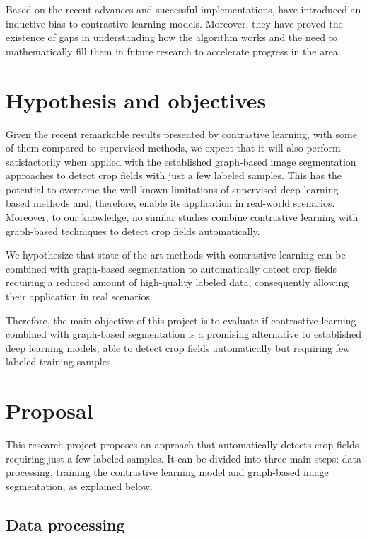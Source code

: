 \documentclass[12pt]{article}
\begin{document}
Based on the recent advances and successful implementations, \citet{saunshi2022} have introduced an inductive bias to contrastive learning models. Moreover, they have proved the existence of gaps in understanding how the algorithm works and the need to mathematically fill them in future research to accelerate progress in the area.

\section{Hypothesis and objectives}\label{section:objetivos}

Given the recent remarkable results presented by contrastive learning, with some of them compared to supervised methods, we expect that it will also perform satisfactorily when applied with the established graph-based image segmentation approaches to detect crop fields with just a few labeled samples. This has the potential to overcome the well-known limitations of supervised deep learning-based methods and, therefore, enable its application in real-world scenarios. Moreover, to our knowledge, no similar studies combine contrastive learning with graph-based techniques to detect crop fields automatically.

We hypothesize that state-of-the-art methods with contrastive learning can be combined with graph-based segmentation to automatically detect crop fields requiring a reduced amount of high-quality labeled data, consequently allowing their application in real scenarios.

Therefore, the main objective of this project is to evaluate if contrastive learning combined with graph-based segmentation is a promising alternative to established deep learning models, able to detect crop fields automatically but requiring few labeled training samples. 


\section{Proposal}\label{section:proposal}

This research project proposes an approach that automatically detects crop fields requiring just a few labeled samples. It can be divided into three main steps: data processing, training the contrastive learning model and graph-based image segmentation, as explained below.

\subsection{Data processing}\label{subsection:dataprocessing}
\end{document}
